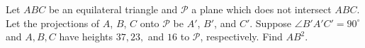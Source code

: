 Let $ABC$ be an equilateral triangle and $\mathcal{P}$ a plane which does not intersect $ABC$. Let the projections of $A$, $B$, $C$ onto $\mathcal{P}$ be $A'$, $B'$, and $C'$. Suppose $\angle B'A'C'=90^{\circ}$ and $A,B,C$ have heights $37,23,$ and $16$ to $\mathcal{P}$, respectively. Find $AB^2$.

